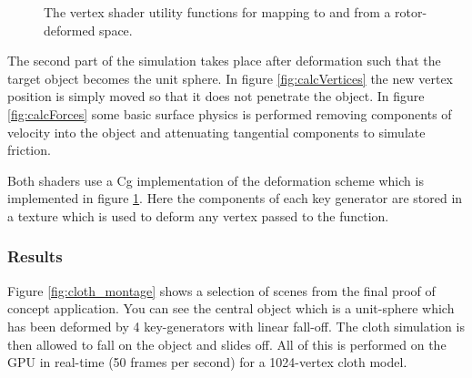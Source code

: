 \begin{figure}[p]
\centering
\scalebox{0.7}{
\begin{minipage}{\textwidth}
\singlespacing

\end{minipage}}
\caption{\label{fig:map}The vertex shader utility functions for mapping to and
  from a rotor-deformed space.}
\end{figure}

The second part of the simulation takes place after deformation such that the
target object becomes the unit sphere. In figure \ref{fig:calcVertices} the new
vertex position is simply moved so that it does not penetrate the object. In
figure \ref{fig:calcForces} some basic surface physics is performed removing
components of velocity into the object and attenuating tangential components to
simulate friction. 

Both shaders use a Cg implementation of the deformation scheme which is
implemented in figure \ref{fig:map}. Here the components of each key generator
are stored in a texture which is used to deform any vertex passed to the
function.

\subsubsection{Results}

Figure \ref{fig:cloth_montage} shows a selection of scenes from the final proof of concept application.
You can see the central object which is a unit-sphere which has been deformed
by 4 key-generators with linear fall-off. The cloth simulation is then allowed
to fall on the object and slides off. All of this is performed on the GPU in
real-time (50 frames per second) for a 1024-vertex cloth model.

